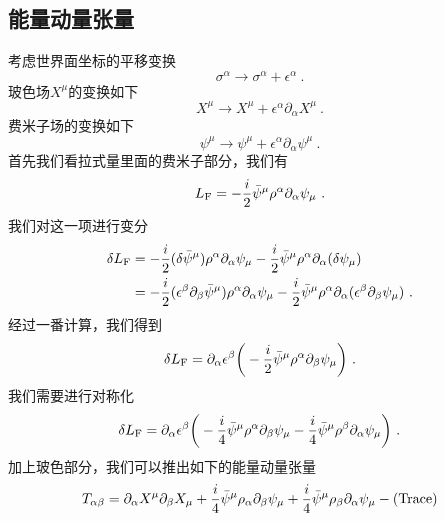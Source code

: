 \subsection{能量动量张量}
考虑世界面坐标的平移变换
\begin{equation}
\sigma^\alpha \rightarrow \sigma^\alpha + \epsilon^\alpha~.
\end{equation}
玻色场$X^\mu$的变换如下
\begin{equation}
X^\mu \rightarrow X^\mu + \epsilon^\alpha \partial_\alpha X^\mu ~.
\end{equation}
费米子场的变换如下
\begin{equation}
\psi^\mu \rightarrow \psi^\mu + \epsilon^\alpha \partial_\alpha \psi^\mu ~.
\end{equation}
首先我们看拉式量里面的费米子部分，我们有
\begin{equation}
L_{\rm F} = - \frac{i}{2} \bar\psi^\mu \rho^\alpha \partial_\alpha \psi_\mu ~.
\end{equation}
我们对这一项进行变分
\begin{equation}
\begin{aligned}
\delta L_{\rm F} & = - \frac{i}{2} (\delta \bar\psi^\mu) \rho^\alpha \partial_\alpha \psi_\mu - \frac{i}{2} \bar\psi^\mu \rho^\alpha \partial_\alpha (\delta \psi_\mu) \\
& = -\frac{i}{2} (\epsilon^\beta\partial_\beta\bar\psi^\mu) \rho^\alpha \partial_\alpha \psi_\mu - \frac{i}{2} \bar\psi^\mu \rho^\alpha \partial_\alpha (\epsilon^\beta\partial_\beta \psi_\mu) ~.
\end{aligned}
\end{equation}
经过一番计算，我们得到
\begin{equation}
\delta L_{\rm F} = \partial_\alpha \epsilon^\beta \bigg( - \frac{i}{2} \bar\psi^\mu \rho^\alpha \partial_\beta \psi_\mu \bigg)~.
\end{equation}
我们需要进行对称化
\begin{equation}
\delta L_{\rm F} = \partial_\alpha \epsilon^\beta \bigg(    -\frac{i}{4} \bar\psi^\mu \rho^\alpha \partial_\beta \psi_\mu - \frac{i}{4} \bar \psi^\mu \rho^\beta\partial_\alpha \psi_\mu  \bigg)~.
\end{equation}
加上玻色部分，我们可以推出如下的能量动量张量
\begin{equation}
T_{\alpha\beta} = \partial_\alpha X^\mu \partial_\beta X_\mu + \frac{i}{4} \bar\psi^\mu \rho_\alpha \partial_\beta \psi_\mu + \frac{i}{4} \bar \psi^\mu \rho_\beta\partial_\alpha\psi_\mu - {\rm (Trace)}
\end{equation}
